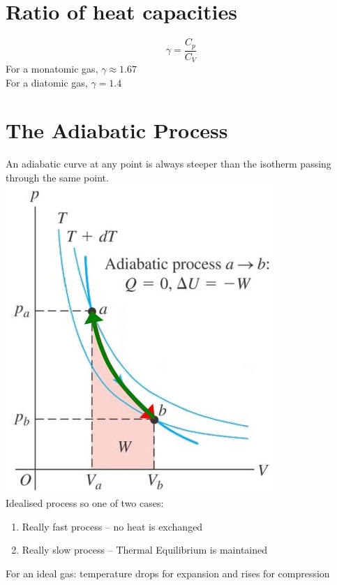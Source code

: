 \documentclass[a4paper, 11pt, normalem]{report}
\begin{document}
\section{Ratio of heat capacities}
\vspace{-22pt}
\begin{equation*}
	\gamma = \frac{C_{p}}{C_{V}}
\end{equation*}
For a monatomic gas, $\gamma \approx 1.67$ \\
For a diatomic gas, $\gamma = 1.4$

\section{The Adiabatic Process}
An adiabatic curve at any point is always steeper than the isotherm passing through the same point. \\
\includegraphics[scale=0.7]{Adiabatic.jpg} \\
Idealised process so one of two cases:
\begin{enumerate}
	\item Really fast process -- no heat is exchanged
	\item Really slow process -- Thermal Equilibrium is maintained
\end{enumerate}
For an ideal gas: temperature drops for expansion and rises for compression
\end{document}
